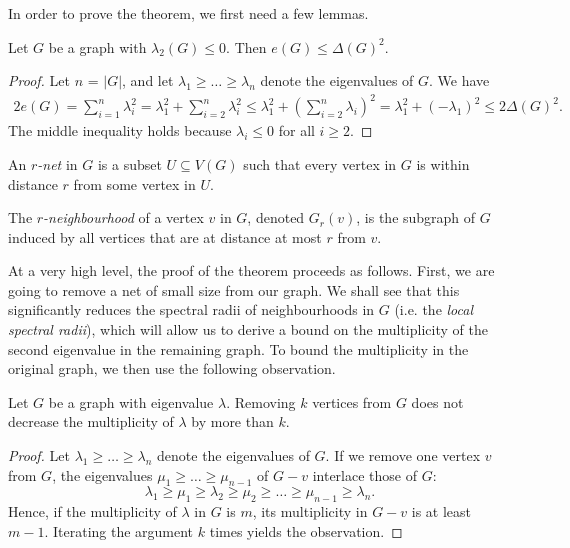 In order to prove the theorem, we first need a few lemmas.

\begin{lemma} \label{lem:bound-size}
    Let $G$ be a graph with $\lambda_2(G) \le 0$. 
    Then $e(G) \le \Delta(G)^2$.
\end{lemma}

\begin{proof}
    Let $n$ = $|G|$, and let $\lambda_1 \ge \dots \ge \lambda_n$ denote the eigenvalues of $G$. We have
    \begin{align*}
        2e(G) = \sum \limits_{i = 1}^n \lambda_i ^2 = \lambda_1^2 + \sum \limits_{i = 2}^n \lambda_i ^2 
        \le \lambda_1^2 + \left( \sum \limits_{i = 2}^n \lambda_i \right)^2 
        = \lambda_1^2 + (-\lambda_1)^2 \le 2 \Delta(G)^2 .
    \end{align*}
    The middle inequality holds because $\lambda_i \le 0$ for all $i \ge 2$.
\end{proof}

\begin{definition}
    An \textit{$r$-net} in $G$ is a subset $U \subseteq V(G)$ such that every vertex in $G$ is within distance $r$ from some vertex in $U$.

    The \textit{$r$-neighbourhood} of a vertex $v$ in $G$, denoted $G_r(v)$, is the subgraph of $G$ induced by all vertices that are at distance at most $r$ from $v$.
\end{definition}

At a very high level, the proof of the theorem proceeds as follows. 
First, we are going to remove a net of small size from our graph. 
We shall see that this significantly reduces the spectral radii of neighbourhoods in $G$ (i.e. the \textit{local spectral radii}), which will allow us to derive a bound on the multiplicity of the second eigenvalue in the remaining graph.
To bound the multiplicity in the original graph, we then use the following observation.

\begin{observation} \label{observation:interlacing}
    Let $G$ be a graph with eigenvalue $\lambda$. 
    Removing $k$ vertices from $G$ does not decrease the multiplicity of $\lambda$ by more than $k$.
\end{observation}

\begin{proof}
    Let $\lambda_1 \ge \dots \ge \lambda_n$ denote the eigenvalues of $G$.
    If we remove one vertex $v$ from $G$, the eigenvalues $\mu_1 \ge \dots \ge \mu_{n - 1}$ of $G - v$ interlace those of $G$:
    \begin{equation*}
        \lambda_1 \ge \mu_1 \ge \lambda_2 \ge \mu_2 \ge \dots \ge \mu_{n - 1} \ge \lambda_n.
    \end{equation*}
    Hence, if the multiplicity of $\lambda$ in $G$ is $m$, its multiplicity in $G - v$ is at least $m - 1$.
    Iterating the argument $k$ times yields the observation.
\end{proof}

